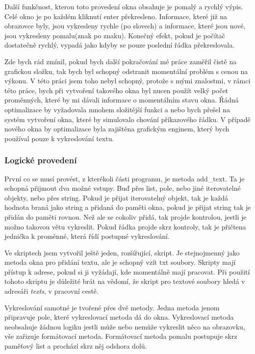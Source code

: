 \documentclass[12pt,a4paper]{article}
\begin{document}
Další funkčnost, kterou toto provedení okna obsahuje je pomalý a rychlý výpis. Celé okno je po každém kliknutí enter překresleno. Informace, které již na obrazovce byly, jsou vykresleny rychle (po slovech) a informace, které jsou nové, jsou vykresleny pomalu(znak po znaku). Konečný efekt, pokud je počítač dostatečně rychlý, vypadá jako kdyby se pouze poslední řádka překreslovala. 

Zde bych rád zmínil, pokud bych další pokračování mé práce zaměřil čistě na grafickou složku, tak bych byl schopný odstranit momentální problém s cenou na výkonu. V této práci jsem toho nebyl schopný, protože s mými znalostmi, v rámci této práce, bych při vytvoření takového okna byl nucen použít velký počet proměnných, které by mi dávali informace o momentálním stavu okna. Řádná optimalizace by vyžadovala mnohem složitější funkci a nebo bych přešel na systém vytvoření okna, které by simulovalo chování příkazového řádku. V případě nového okna by optimalizace byla zajištěna grafickým enginem, který bych používal pouze k vykreslování textu.
\subsubsection{Logické provedení}
První co se musí provést, z kterékoli části programu, je metoda add\_text. Ta je schopná přijmout dva možné vstupy. Buď přes list, pole, nebo jiné iterovatelné objekty, nebo přes string. Pokud je přijat iterovatelný objekt, tak je každá hodnota braná jako string a přidaná do paměti okna, pokud je přijat string tak je přidán do paměti rovnou. Než ale se cokoliv přidá, tak projde kontrolou, jestli je možno takovou větu vykreslit. Pokud řádka projde skrz kontroly, tak je přičtena jednička k proměnné, která řídí postupné vykreslování.

Ve skriptech jsem vytvořil ještě jeden, rozšířující, skript. Je stejnojmenný jako metoda okna pro přidání textu, ale je schopný vzít txt soubory. Skripty mají přístup k adrese, pokud si ji vyžádají, kde momentálně mají pracovat. Při použití tohoto skriptu je důležité brát na vědomí, že skript pro textové soubory hledá v adresáři \textit{texts}, v pracovní cestě.

Vykreslování samotné je tvořené přes dvě metody. Jedna metoda jenom připravuje pole, které vykreslovací metoda dá do okna. Vykreslovací metoda neobsahuje žádnou logiku jestli může nebo nemůže vykreslit něco na obrazovku, vše zařizuje formátovací metoda.
Formátovací metoda pomalu postupuje skrz paměťový list a prochází skrz něj odshora dolů.
\end{document}
